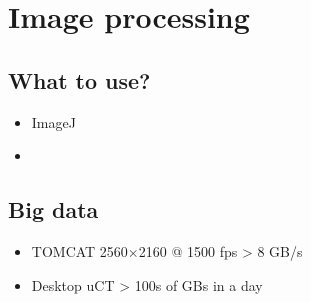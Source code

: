\documentclass[aspectratio=169,10pt,draft]{beamer}
\begin{document}
\section{Image processing}

\subsection{What to use?}

\begin{frame}
	\begin{itemize}
		\item ImageJ
		\item \faPython
	\end{itemize}
\end{frame}

\subsection{Big data}

\begin{frame}

\begin{itemize}
	\item TOMCAT 2560\(\times\)2160 @ 1500 fps \textgreater{} 8 GB/s
	\item Desktop uCT \textgreater{} 100s of GBs in a day
\end{itemize}
\end{frame}
\end{document}
